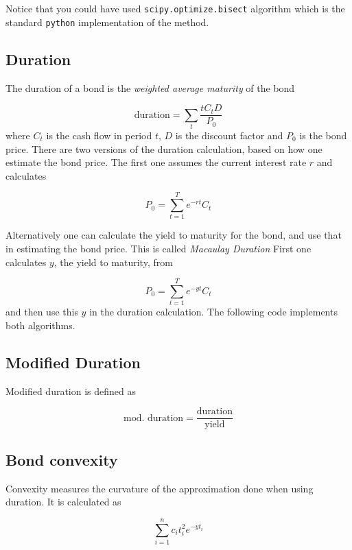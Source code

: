 Notice that you could have used \texttt{scipy.optimize.bisect} algorithm which is the standard \texttt{python} 
implementation of the method.

\subsection{Duration}
The duration of a bond is the \emph{weighted average maturity} of the bond

\begin{equation}
	\textrm{duration} = \sum_t \frac{t C_t D}{P_0} 
\end{equation}
where $C_t$ is the cash flow in period $t$, $D$ is the discount factor and $P_0$ is the bond price.
There are two versions of the duration calculation, based on how one estimate the bond price. The first one assumes the current interest rate $r$ and calculates

\begin{equation}
	P_0 = \sum_{t=1}^T e^{-rt}C_t
\end{equation}

Alternatively one can calculate the yield to maturity for the bond, and use that in estimating the bond price. This is called \emph{Macaulay Duration} First one calculates $y$, the yield to maturity, from

\begin{equation}
	P_0 = \sum_{t=1}^T e^{-yt}C_t
\end{equation}
and then use this $y$ in the duration calculation.
The following code implements both algorithms.


\subsection{Modified Duration}
Modified duration is defined as

\begin{equation}
	\textrm{mod. duration} = \frac{\textrm{duration}}{\textrm{yield}} 
\end{equation}

\subsection{Bond convexity}
Convexity measures the curvature of the approximation done when using duration. It is calculated as

\begin{equation}
	\sum_{i=1}^nc_it_i^2e^{-yt_i}
\end{equation}

